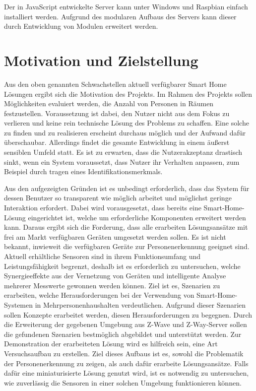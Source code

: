 \documentclass[12pt, oneside, smallheadings]{scrbook}
\begin{document}
Der in JavaScript entwickelte Server kann unter Windows und Raspbian einfach installiert werden. Aufgrund des modularen Aufbaus des Servers kann dieser durch Entwicklung von Modulen erweitert werden.

\section{Motivation und Zielstellung}

Aus den oben genannten Schwachstellen aktuell verfügbarer Smart Home Lösungen ergibt sich die Motivation des Projekts. Im Rahmen des Projekts sollen Möglichkeiten evaluiert werden, die Anzahl von Personen in Räumen festzustellen.
Voraussetzung ist dabei, den Nutzer nicht aus dem Fokus zu verlieren und keine rein technische Lösung des Problems zu schaffen. Eine solche zu finden und zu realisieren erscheint durchaus möglich und der Aufwand dafür überschaubar. Allerdings findet die gesamte Entwicklung in einem äußerst sensiblen Umfeld statt. Es ist zu erwarten, dass die Nutzerakzeptanz drastisch sinkt, wenn ein System voraussetzt, dass Nutzer ihr Verhalten anpassen, zum Beispiel durch tragen eines Identifikationsmerkmals.

Aus den aufgezeigten Gründen ist es unbedingt erforderlich, dass das System für dessen Benutzer so transparent wie möglich arbeitet und möglichst geringe Interaktion erfordert. Dabei wird vorausgesetzt, dass bereits eine Smart-Home-Lösung eingerichtet ist, welche um erforderliche Komponenten erweitert werden kann. Daraus ergibt sich die Forderung, dass alle erarbeiten Lösungsansätze mit frei am Markt verfügbaren Geräten umgesetzt werden sollen.
Es ist nicht bekannt, inwieweit die verfügbaren Geräte zur Personenerkennung geeignet sind. Aktuell erhältliche Sensoren sind in ihrem Funktionsumfang und Leistungsfähigkeit begrenzt, deshalb ist es erforderlich zu untersuchen, welche Synergieeffekte aus der Vernetzung von Geräten und intelligente Analyse mehrerer Messwerte gewonnen werden können.
Ziel ist es, Szenarien zu erarbeiten, welche Herausforderungen bei der Verwendung von Smart-Home-Systemen in Mehrpersonenhaushalten verdeutlichen. Aufgrund dieser Szenarien sollen Konzepte erarbeitet werden, diesen Herausforderungen zu begegnen. Durch die Erweiterung der gegebenen Umgebung aus Z-Wave und Z-Way-Server sollen die gefundenen Szenarien bestmöglich abgebildet und unterstützt werden.
Zur Demonstration der erarbeiteten Lösung wird es hilfreich sein, eine Art Versuchsaufbau zu erstellen. Ziel dieses Aufbaus ist es, sowohl die Problematik der Personenerkennung zu zeigen, als auch dafür erarbeite Lösungsansätze. Falls dafür eine miniaturisierte Lösung genutzt wird, ist es notwendig zu untersuchen, wie zuverlässig die Sensoren in einer solchen Umgebung funktionieren können.
\end{document}
